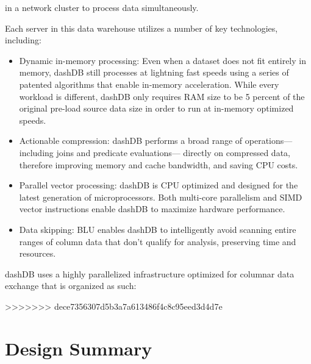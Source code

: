 \documentclass[letterpaper]{article}
\begin{document}
	in a network cluster to process data simultaneously. 
	\par\vspace{\baselineskip}
	\cite{dashDB}
	\par\vspace{\baslineskip}
	Each server in this data warehouse utilizes a number of key technologies, including: 
	\begin{itemize}
	  \item Dynamic in-memory processing: Even when a dataset
	  does not fit entirely in memory, dashDB still processes at
	  lightning fast speeds using a series of patented algorithms
	  that enable in-memory acceleration. While every workload
	  is different, dashDB only requires RAM size to be 5 percent
	  of the original pre-load source data size in order to run at
      in-memory optimized speeds.
     \item Actionable compression: dashDB performs a broad range
	  of operations—including joins and predicate evaluations—
	  directly on compressed data, therefore improving memory
	  and cache bandwidth, and saving CPU costs.
   	 \item Parallel vector processing: dashDB is CPU optimized
	  and designed for the latest generation of microprocessors.
	  Both multi-core parallelism and SIMD vector instructions
      enable dashDB to maximize hardware performance.
	  \item Data skipping: BLU enables dashDB to intelligently avoid
	  scanning entire ranges of column data that don’t qualify for
	  analysis, preserving time and resources.
	\end{itemize}
	
	dashDB uses a highly parallelized infrastructure optimized for columnar data
	exchange that is organized as such:
	\par\vspace{\baselineskip}
	\cite{dashDB}
	\par\vspace{\baselineskip}
	
		
	
>>>>>>> dece7356307d5b3a7a613486f4c8c95eed3d4d7e
\newpage

\section{Design Summary}
\newpage
\end{document}
